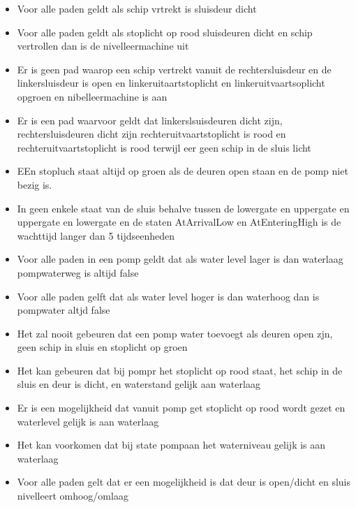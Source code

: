 \begin{itemize}
	\item Voor alle paden geldt als schip vrtrekt is sluisdeur dicht
	\item Voor alle paden geldt als stoplicht op rood sluisdeuren dicht en schip vertrollen dan is de nivelleermachine uit
	\item Er is geen pad waarop een schip vertrekt vanuit de rechtersluisdeur en de linkersluisdeur is open en linkeruitaartstoplicht en linkeruitvaartsoplicht opgroen  en nibelleermachine is aan
	\item Er is een pad waarvoor geldt dat linkerslsuisdeuren dicht zijn, rechtersluisdeuren dicht zijn rechteruitvaartstoplicht is rood en rechteruitvaartstoplicht is  rood terwijl eer geen schip in de sluis licht
	\item  EEn stopluch staat altijd op groen als de deuren open staan en de pomp niet bezig is.
	\item  In geen enkele staat van de sluis behalve tussen de lowergate en uppergate en uppergate en lowergate en de staten AtArrivalLow en AtEnteringHigh is de wachttijd langer dan 5 tijdseenheden
	\item Voor alle paden in een pomp geldt dat als water level lager is dan waterlaag pompwaterweg is altijd false
	\item Voor alle paden gelft dat als water level hoger is dan waterhoog dan is pompwater altjd false
	\item  Het zal nooit gebeuren dat een pomp water toevoegt als deuren open zjn, geen schip in sluis en stoplicht op groen
	\item  Het kan gebeuren dat bij pompr het stoplicht op rood staat, het schip in de sluis en deur is dicht, en waterstand gelijk aan waterlaag
	\item Er is een mogelijkheid  dat vanuit pomp get stoplicht op rood wordt gezet en waterlevel gelijk is aan waterlaag
	\item  Het kan voorkomen dat bij state pompaan het waterniveau gelijk is aan waterlaag
	\item   Voor alle paden gelt dat er een mogelijkheid is dat deur is open/dicht en sluis nivelleert omhoog/omlaag
	
\end{itemize}




